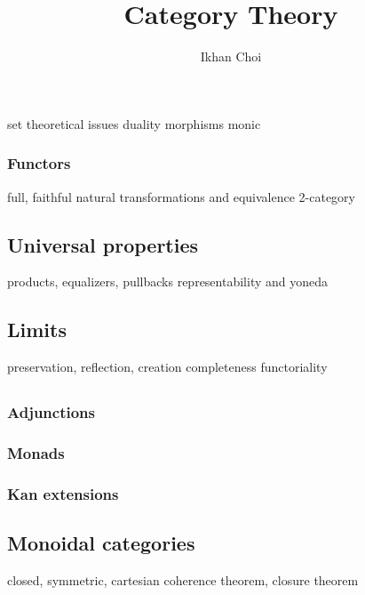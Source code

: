 \documentclass{../../large}
\begin{document}
\title{Category Theory}
\author{Ikhan Choi}
\maketitle
\tableofcontents


\part{}

\chapter{}
set theoretical issues
duality
morphisms
	monic
\section{Functors}
full, faithful
natural transformations and equivalence
2-category


\chapter{Universal properties}
products, equalizers, pullbacks
representability and yoneda
\chapter{Limits}
preservation, reflection, creation
completeness
functoriality

\chapter{}
\section{Adjunctions}

\section{Monads}

\section{Kan extensions}



\chapter{Monoidal categories}
closed, symmetric, cartesian
coherence theorem, closure theorem
\end{document}
